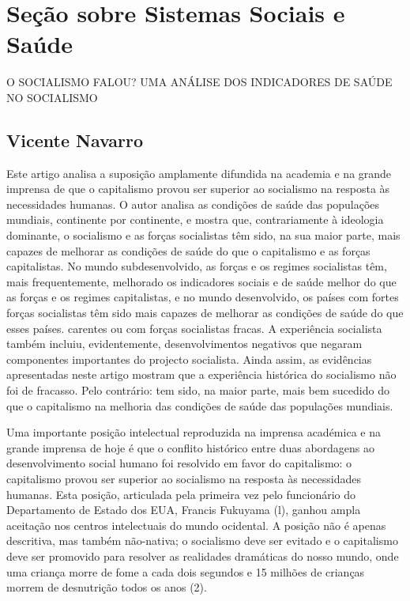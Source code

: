 \chapter{Seção sobre Sistemas Sociais e Saúde}\label{Seção sobre Sistemas Sociais e Saúde}
 \par 
O SOCIALISMO FALOU? UMA ANÁLISE DOS INDICADORES DE SAÚDE NO SOCIALISMO
 \par 
\section{Vicente Navarro}
 \par 
Este artigo analisa a suposição amplamente difundida na academia e na grande imprensa de que o capitalismo provou ser superior ao socialismo na resposta às necessidades humanas. O autor analisa as condições de saúde das populações mundiais, continente por continente, e mostra que, contrariamente à ideologia dominante, o socialismo e as forças socialistas têm sido, na sua maior parte, mais capazes de melhorar as condições de saúde do que o capitalismo e as forças capitalistas. No mundo subdesenvolvido, as forças e os regimes socialistas têm, mais frequentemente, melhorado os indicadores sociais e de saúde melhor do que as forças e os regimes capitalistas, e no mundo desenvolvido, os países com fortes forças socialistas têm sido mais capazes de melhorar as condições de saúde do que esses países. carentes ou com forças socialistas fracas. A experiência socialista também incluiu, evidentemente, desenvolvimentos negativos que negaram componentes importantes do projecto socialista. Ainda assim, as evidências apresentadas neste artigo mostram que a experiência histórica do socialismo não foi de fracasso. Pelo contrário: tem sido, na maior parte, mais bem sucedido do que o capitalismo na melhoria das condições de saúde das populações mundiais.
 \par 
Uma importante posição intelectual reproduzida na imprensa académica e na grande imprensa de hoje é que o conflito histórico entre duas abordagens ao desenvolvimento social humano foi resolvido em favor do capitalismo: o capitalismo provou ser superior ao socialismo na resposta às necessidades humanas. Esta posição, articulada pela primeira vez pelo funcionário do Departamento de Estado dos EUA, Francis Fukuyama (l), ganhou ampla aceitação nos centros intelectuais do mundo ocidental. A posição não é apenas descritiva, mas também não-nativa; o socialismo deve ser evitado e o capitalismo deve ser promovido para resolver as realidades dramáticas do nosso mundo, onde uma criança morre de fome a cada dois segundos e {\color{blue}15} milhões de crianças morrem de desnutrição todos os anos (2).
